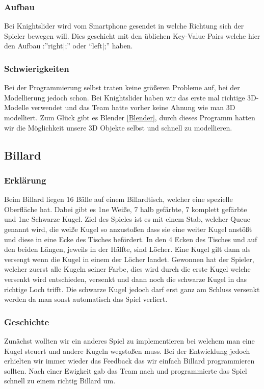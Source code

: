 \subsubsection{Aufbau}
Bei Knightslider wird vom Smartphone gesendet in welche Richtung sich der Spieler bewegen will. Dies geschieht mit den üblichen Key-Value Pairs welche hier den Aufbau :”right|;” oder “left|;” haben.
\subsubsection{Schwierigkeiten}
Bei der Programmierung selbst traten keine größeren Probleme auf, bei der Modellierung jedoch schon. Bei Knightslider haben wir das erste mal richtige 3D-Modelle verwendet und das Team hatte vorher keine Ahnung wie man 3D modelliert. Zum Glück gibt es Blender \ref{Blender}, durch dieses Programm hatten wir die Möglichkeit unsere 3D Objekte selbst und schnell zu modellieren.
\subsection{Billard}
\subsubsection{Erklärung}
Beim Billard liegen 16 Bälle auf einem Billardtisch, welcher eine spezielle Oberfläche hat. Dabei gibt es 1ne Weiße, 7 halb gefärbte, 7 komplett gefärbte und 1ne Schwarze Kugel. Ziel des Spieles ist es mit einem Stab, welcher Queue genannt wird, die weiße Kugel so anzustoßen dass sie eine weiter Kugel anstößt und diese in eine Ecke des Tisches befördert. In den 4 Ecken des Tisches und auf den beiden Längen, jeweils in der Hälfte, sind Löcher. Eine Kugel gilt dann als versengt wenn die Kugel in einem der Löcher landet. Gewonnen hat der Spieler, welcher zuerst alle Kugeln seiner Farbe, dies wird durch die erste Kugel welche versenkt wird entschieden, versenkt und dann noch die schwarze Kugel in das richtige Loch trifft. Die schwarze Kugel jedoch darf erst ganz am Schluss versenkt werden da man sonst automatisch das Spiel verliert.
\subsubsection{Geschichte}
Zunächst wollten wir ein anderes Spiel zu implementieren bei welchem man eine Kugel steuert und andere Kugeln wegstoßen muss. Bei der Entwicklung jedoch erhielten wir immer wieder das Feedback das wir einfach Billard programmieren sollten. Nach einer Ewigkeit gab das Team nach und programmierte das Spiel schnell zu einem richtig Billard um.
